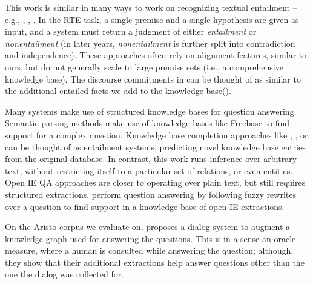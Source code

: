 This work is similar in many ways to work on 
  recognizing textual entailment -- e.g., 
  , ,
  .
In the RTE task, a single premise and a single hypothesis are given as input,
  and a system must return a judgment of either \textit{entailment} or
  \textit{nonentailment} (in later years, \textit{nonentailment} is further
  split into contradiction and independence).
These approaches often rely on alignment features, similar to ours, but
  do not generally scale to large premise sets (i.e., a comprehensive
  knowledge base).
The discourse commitments in  can be thought
  of as similar to the additional entailed facts we add to the
  knowledge base().

Many systems make use of structured knowledge bases for question
  answering.
Semantic parsing methods 
  \cite{key:2005zettlemoyer-semantics,key:2011liang-semantics}
  make use of knowledge bases like Freebase to find support for a
  complex question.
Knowledge base completion approaches like
, ,
  or  can be thought of as entailment
  systems, predicting novel knowledge base entries from the original
  database.
In contrast, this work runs inference over arbitrary text, without 
  restricting itself to a particular set of relations, or even entities.
Open IE \cite{key:2010wu-openie,key:2012mausam-ollie}
  QA approaches are closer to operating over plain text, but
  still requires structured extractions.
 perform question answering by following
  fuzzy rewrites over a question to find support in a knowledge base
  of open IE extractions.

On the Aristo corpus we evaluate on,  proposes
  a dialog system to augment a knowledge graph used for answering the questions.
This is in a sense an oracle measure, where a human is consulted while answering
  the question; although, they show that their additional extractions help
  answer questions other than the one the dialog was collected for.



